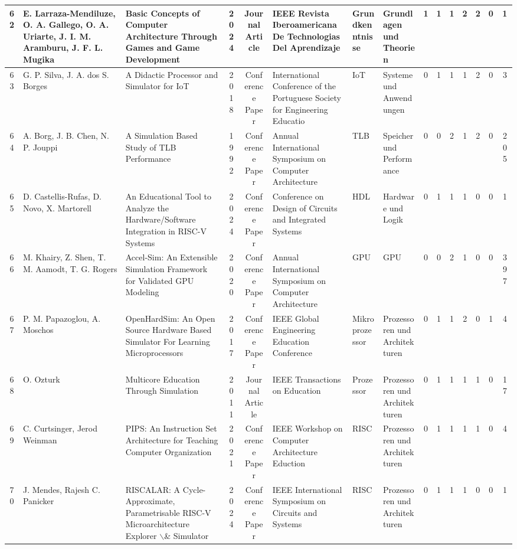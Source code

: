 \begin{landscape}
\begin{longtable}{|c|p{2cm}|p{2cm}|c|c|p{2cm}|p{1cm}|p{1cm}|c|c|c|c|c|c|c|}
    62 & E. Larraza-Mendiluze, O. A. Gallego, O. A. Uriarte, J. I. M. Aramburu, J. F. L. Mugika & Basic Concepts of Computer Architecture Through Games and Game Development & 2024 & Journal Article & IEEE Revista Iberoamericana De Technologias Del Aprendizaje & Grundkenntnisse & Grundlagen und Theorien & 1 & 1 & 1 & 2 & 2 & 0 & 1 \\ \hline
    63 & G. P. Silva, J. A. dos S. Borges & A Didactic Processor and Simulator for IoT & 2018 & Conference Paper & International Conference of the Portuguese Society for Engineering Educatio & IoT & Systeme und Anwendungen & 0 & 1 & 1 & 1 & 2 & 0 & 3 \\ \hline
    64 & A. Borg, J. B. Chen, N. P. Jouppi & A Simulation Based Study of TLB Performance & 1992 & Conference Paper & Annual International Symposium on Computer Architecture & TLB & Speicher und Performance & 0 & 0 & 2 & 1 & 2 & 0 & 205 \\ \hline
    65 & D. Castellis-Rufas, D. Novo, X. Martorell & An Educational Tool to Analyze the Hardware/Software Integration in RISC-V Systems & 2024 & Conference Paper & Conference on Design of Circuits and Integrated Systems & HDL & Hardware und Logik & 0 & 1 & 1 & 1 & 0 & 0 & 1 \\ \hline
    66 & M. Khairy, Z. Shen, T. M. Aamodt, T. G. Rogers & Accel-Sim: An Extensible Simulation Framework for Validated GPU Modeling & 2020 & Conference Paper & Annual International Symposium on Computer Architecture & GPU & GPU & 0 & 0 & 2 & 1 & 0 & 0 & 397 \\ \hline
    67 & P. M. Papazoglou, A. Moschos & OpenHardSim: An Open Source Hardware Based Simulator For Learning Microprocessors & 2017 & Conference Paper & IEEE Global Engineering Education Conference & Mikroprozessor & Prozessoren und Architekturen & 0 & 1 & 1 & 2 & 0 & 1 & 4 \\ \hline
    68 & O. Ozturk & Multicore Education Through Simulation & 2011 & Journal Article & IEEE Transactions on Education & Prozessor & Prozessoren und Architekturen & 0 & 1 & 1 & 1 & 1 & 0 & 17 \\ \hline
    69 & C. Curtsinger, Jerod Weinman & PIPS: An Instruction Set Architecture for Teaching Computer Organization & 2021 & Conference Paper & IEEE Workshop on Computer Architecture Eduction & RISC & Prozessoren und Architekturen & 0 & 1 & 1 & 1 & 1 & 0 & 4 \\ \hline
    70 & J. Mendes, Rajesh C. Panicker & RISCALAR: A Cycle-Approximate, Parametrisable RISC-V Microarchitecture Explorer $\backslash$\& Simulator & 2024 & Conference Paper & IEEE International Symposium on Circuits and Systems & RISC & Prozessoren und Architekturen & 0 & 1 & 1 & 1 & 0 & 0 & 1 \\ \hline

\end{longtable}
\end{landscape}
